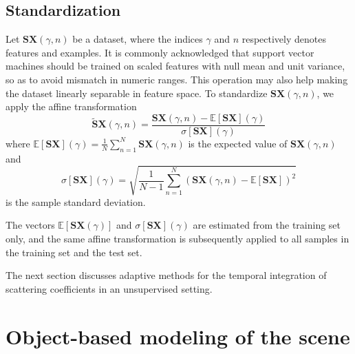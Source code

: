 \documentclass[journal]{IEEEtran}
\begin{document}
\subsection{Standardization}
\label{sec:stand}

Let $\mathbf{S}\boldsymbol{X}(\gamma,n)$ be a dataset, where the indices $\gamma$ and $n$ respectively denotes features and examples.
It is commonly acknowledged that support vector machines should be trained on scaled features with null mean and unit variance, so as to avoid mismatch in numeric ranges.
This operation may also help making the dataset linearly separable in feature space.
To standardize $\mathbf{S}\boldsymbol{X}(\gamma,n)$, we apply the affine transformation
\begin{equation}
\widetilde{\mathbf{S}}\boldsymbol{X}(\gamma, n) =
\dfrac{ \mathbf{S}\boldsymbol{X}(\gamma, n) -
\mathbb{E}[ \mathbf{S}\boldsymbol{X}](\gamma)}{\sigma[ \mathbf{S}\boldsymbol{X}](\gamma)}
\end{equation}
where $\mathbb{E}[ \mathbf{S}\boldsymbol{X}](\gamma) = \frac{1}{N} \sum_{n=1}^{N} \mathbf{S}\boldsymbol{X}(\gamma,n)$ is the expected value of $\mathbf{S}\boldsymbol{X}(\gamma,n)$ and
\begin{equation}
\sigma[\mathbf{S}\boldsymbol{X}] (\gamma) =
\sqrt{\frac{1}{N-1} \sum_{n=1}^{N}
\left( \mathbf{S}\boldsymbol{X}(\gamma,n) - \mathbb{E}[\mathbf{S}\boldsymbol{X}] \right)^2}
\end{equation}
 is the sample standard deviation.
 
 The vectors $\mathbb{E}[\mathbf{S}\boldsymbol{X}(\gamma)]$ and $\sigma[\mathbf{S}\boldsymbol{X}](\gamma)$ are estimated from the training set only, and the same affine transformation is subsequently applied to all samples in the training set and the test set.
 
The next section discusses adaptive methods for the temporal integration of scattering coefficients in an unsupervised setting.

\section{Object-based modeling of the scene}
\label{sec:object}

\end{document}
